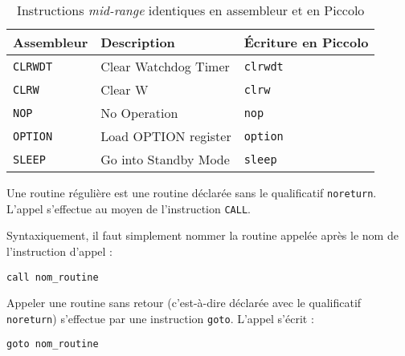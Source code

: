 \begin{table}[!ht]
  \centering
  \small
  \begin{tabular}{lll}
    \textbf{Assembleur} & \textbf{Description} & \textbf{Écriture en Piccolo}\\
    \hline
    \texttt{CLRWDT} & Clear Watchdog Timer & \texttt{clrwdt}\\
    \texttt{CLRW} & Clear W & \texttt{clrw}\\
    \texttt{NOP} & No Operation & \texttt{nop}\\
    \texttt{OPTION} & Load OPTION register & \texttt{option}\\
    \texttt{SLEEP} & Go into Standby Mode & \texttt{sleep}\\
    \hline
  \end{tabular}
  \caption{Instructions \emph{mid-range} identiques en assembleur et en Piccolo}
\end{table}




























Une routine régulière est une routine déclarée sans le qualificatif \texttt{noreturn}. L'appel s’effectue au moyen de l'instruction \texttt{CALL}.

Syntaxiquement, il faut simplement nommer la routine appelée après le nom de l’instruction d’appel :

\begin{lstlisting}[language=piccolo]
call nom_routine
\end{lstlisting}





Appeler une routine sans retour (c'est-à-dire déclarée avec le qualificatif \texttt{noreturn}) s'effectue par une instruction \texttt{goto}. L'appel s'écrit :
\begin{lstlisting}[language=piccolo]
goto nom_routine
\end{lstlisting}




